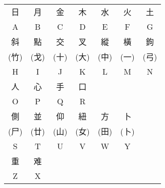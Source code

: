 \documentclass[12pt,a5paper]{ujbook}
\begin{document}
\begin{center}
\begin{tabular}{ c c c c c c c }
日 & 月 & 金 & 木 & 水 & 火 & 土\\
A & B & C & D & E & F & G\\
\hline
斜 & 點 & 交 & 叉 & 縱 & 橫 & 鉤\\
(竹) & (戈) & (十) & (大) & (中) & (一) & (弓)\\
H & I & J & K & L & M & N\\
\hline
人 & 心 & 手 & 口\\
O & P & Q & R\\
\hline
側 & 並 & 仰 & 紐 & 方 & 卜\\
(尸) & (廿) & (山) & (女) & (田) & (卜)\\
S & T & U & V & W & Y\\
\hline
重 & 难\\
Z & X\\
\end{tabular}
\end{center}
\end{document}
